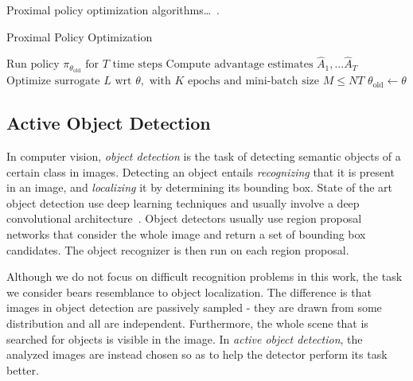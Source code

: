
Proximal policy optimization algorithms\dots~\cite{schulman_ppo_2017}.

\begin{algorithm}
    \caption{Proximal Policy Optimization}
    \begin{algorithmic}
                \State \(\text{Run policy } \pi_{\theta_\text{old}} \text{ for } T \text{ time steps}\)
                \State \(\text{Compute advantage estimates } \hat{A}_1, \dots \hat{A}_T\)
            \EndFor
            \State \(\text{Optimize surrogate } L \text{ wrt } \theta, \text{ with } K \text{ epochs and mini-batch size } M \leq NT\)
            \State \(\theta_{\text{old}} \leftarrow \theta\)
        \EndFor
    \end{algorithmic}
\end{algorithm}

\subsection{Active Object Detection}


In computer vision, \textit{object detection} is the task of detecting semantic objects of a certain class in images.
Detecting an object entails \textit{recognizing} that it is present in an image, and \textit{localizing} it by determining its bounding box.
State of the art object detection use deep learning techniques and usually involve a deep convolutional architecture~\cite{zhao_objectdetection_2019}.
Object detectors usually use region proposal networks that consider the whole image and return a set of bounding box candidates.
The object recognizer is then run on each region proposal.

Although we do not focus on difficult recognition problems in this work, the task we consider bears resemblance to object localization.
The difference is that images in object detection are passively sampled - they are drawn from some distribution and all are independent.
Furthermore, the whole scene that is searched for objects is visible in the image.
In \textit{active object detection}, the analyzed images are instead chosen so as to help the detector perform its task better.

